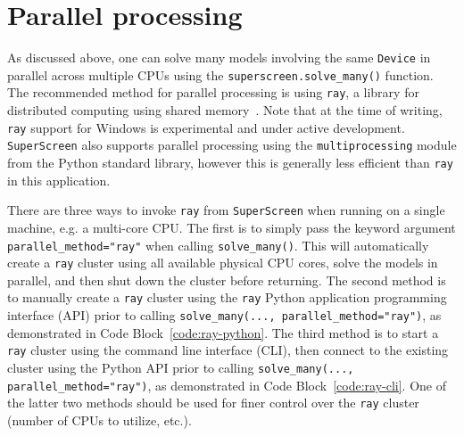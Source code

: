 \documentclass[final,3p,times]{elsarticle}
\newcommand{\inline}[1]{\texttt{#1}\xspace}
\newcommand{\SuperScreen}{\inline{SuperScreen}}
\begin{document}

\section{Parallel processing}
\label{section:parallel}
As discussed above, one can solve many models involving the same \inline{Device} in parallel across multiple CPUs using the \inline{superscreen.solve_many()} function. The recommended method for parallel processing is using \inline{ray}, a library for distributed computing using shared memory~\cite{ray_2018}. Note that at the time of writing, \inline{ray} support for Windows is experimental and under active development. \SuperScreen also supports parallel processing using the \inline{multiprocessing} module from the Python standard library, however this is generally less efficient than \inline{ray} in this application.

There are three ways to invoke \inline{ray} from \SuperScreen when running on a single machine, e.g. a multi-core CPU. The first is to simply pass the keyword argument \inline{parallel_method="ray"} when calling \inline{solve_many()}. This will automatically create a \inline{ray} cluster using all available physical CPU cores, solve the models in parallel, and then shut down the cluster before returning. The second method is to manually create a \inline{ray} cluster using the \inline{ray} Python application programming interface (API) prior to calling \inline{solve_many(..., parallel_method="ray")}, as demonstrated in Code Block~\ref{code:ray-python}. The third method is to start a \inline{ray} cluster using the command line interface (CLI), then connect to the existing cluster using the Python API prior to calling \inline{solve_many(..., parallel_method="ray")}, as demonstrated in Code Block~\ref{code:ray-cli}. One of the latter two methods should be used for finer control over the \inline{ray} cluster (number of CPUs to utilize, etc.).
\end{document}
